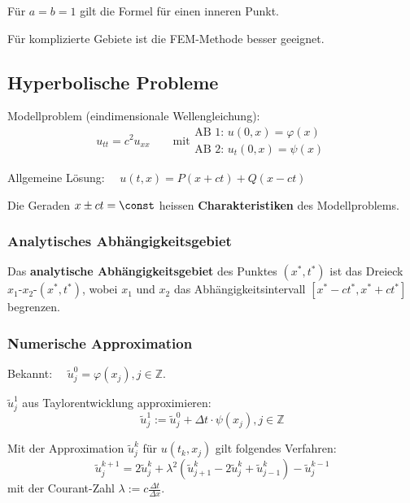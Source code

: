			\begin{tightitemize}
				\item Für $a=b=1$ gilt die Formel für einen inneren Punkt.\\
				\item Für komplizierte Gebiete ist die FEM-Methode besser geeignet. 
			\end{tightitemize}

	\subsection{Hyperbolische Probleme} Modellproblem (eindimensionale Wellengleichung):
		\[
			u_{tt}=c^2u_{xx} \qquad \text{mit} \begin{array}{l}
				\text{AB 1: } u(0,x)=\varphi(x) \\
				\text{AB 2: } u_t(0,x)=\psi(x)
			\end{array}
		\]
		
		Allgemeine Lösung: $\quad u(t,x)=P(x+ct)+Q(x-ct) $
		
		Die Geraden $x \pm ct = \const$ heissen \textbf{Charakteristiken} des Modellproblems. 
		
		\subsubsection{Analytisches Abhängigkeitsgebiet}
			Das \textbf{analytische Abhängigkeitsgebiet} des Punktes $(x^*,t^*)$ ist das Dreieck $x_1$-$x_2$-$(x^*,t^*)$, wobei $x_1$ und $x_2$ das Abhängigkeitsintervall $[x^*-ct^*, x^*+ct^*]$ begrenzen. 
			
		\subsubsection{Numerische Approximation} 
			\begin{tightenumerate}
				\item Bekannt: $\quad \tilde u_j^0=\varphi(x_j), j \in \mathbb{Z}$. 
				\item $\tilde u_j^1$ aus Taylorentwicklung approximieren:
					\[
						\tilde u_j^1 := \tilde u_j^0 + \Delta t \cdot \psi(x_j), j \in \mathbb{Z}
					\]
				\item Mit der Approximation $\tilde u_j^k$ für $u(t_k,x_j)$ gilt folgendes Verfahren:
					\[
						\tilde u_j^{k+1} = 2\tilde u_j^k + \lambda^2 \left( \tilde u_{j+1}^k -2\tilde u_j^k + \tilde u_{j-1}^k\right) - \tilde u_j^{k-1}
					\]
					mit der Courant-Zahl $ \lambda := c \frac{\Delta t}{\Delta x}$. 
			\end{tightenumerate}
			

